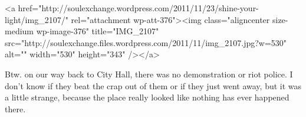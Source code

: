 \begin{post}
\begin{content}
<a href="http://soulexchange.wordpress.com/2011/11/23/shine-your-light/img_2107/" rel="attachment wp-att-376"><img class="aligncenter size-medium wp-image-376" title="IMG_2107" src="http://soulexchange.files.wordpress.com/2011/11/img_2107.jpg?w=530" alt="" width="530" height="343" /></a>

Btw. on our way back to City Hall, there was no demonstration or riot police. I don't know if they beat the crap out of them or if they just went away, but it was a little strange, because the place really looked like nothing has ever happened there.
	\end{content}
\end{post}
